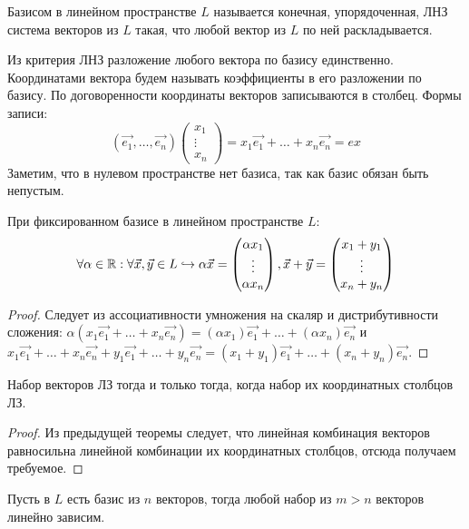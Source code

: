 \begin{definition}
    Базисом в линейном пространстве $L$ называется конечная, упорядоченная, ЛНЗ система векторов из $L$ такая, что любой вектор из $L$ по ней раскладывается.
\end{definition}
Из критерия ЛНЗ разложение любого вектора по базису единственно. Координатами вектора будем называть коэффициенты в его разложении по базису. По договоренности координаты векторов записываются в столбец. Формы записи:
\[
(\vec{e_1}, \dots, \vec{e_n}) \begin{pmatrix} x_1 \\ \vdots \\ x_n \end{pmatrix}=x_1 \vec{e_1} + \dots +x_n \vec{e_n}=ex
\]
Заметим, что в нулевом пространстве нет базиса, так как базис обязан быть непустым.
\begin{proposition}
    При фиксированном базисе в линейном пространстве $L$:
    \[
    \forall \alpha \in \mathbb{R}: \forall\vec{x}, \vec{y} \in L \hookrightarrow \alpha\vec{x}=\begin{pmatrix}
        \alpha x_1 \\
        \vdots \\
        \alpha x_n
    \end{pmatrix}, \vec{x} + \vec{y}=\begin{pmatrix}
        x_1 + y_1 \\
        \vdots \\
        x_n + y_n
    \end{pmatrix}
    \]
\end{proposition}
\begin{proof}
    Следует из ассоциативности умножения на скаляр и дистрибутивности сложения: $\alpha (x_1 \vec{e_1} + \dots +x_n \vec{e_n})=(\alpha x_1) \vec{e_1} + \dots + (\alpha x_n) \vec{e_n}$ и $x_1 \vec{e_1} + \dots +x_n \vec{e_n} + y_1 \vec{e_1} + \dots + y_n \vec{e_n}= (x_1 + y_1) \vec{e_1} + \dots + (x_n + y_n) \vec{e_n}$.
\end{proof}
\begin{proposition}
    Набор векторов ЛЗ тогда и только тогда, когда набор их координатных столбцов ЛЗ.
\end{proposition}
\begin{proof}
    Из предыдущей теоремы следует, что линейная комбинация векторов равносильна линейной комбинации их координатных столбцов, отсюда получаем требуемое.
\end{proof}
\begin{theorem}
    Пусть в $L$ есть базис из $n$ векторов, тогда любой набор из $m>n$ векторов линейно зависим.
\end{theorem}
